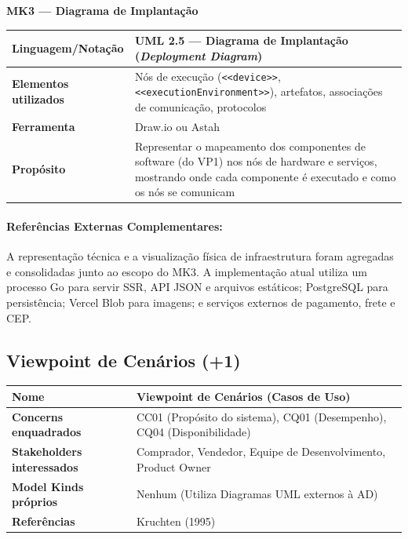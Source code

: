 ﻿\documentclass[12pt,a4paper]{article}
\begin{document}
\noindent\textbf{MK3 --- Diagrama de Implantação}
\begin{longtable}{|p{4.5cm}|p{10cm}|}
\hline
\textbf{Linguagem/Notação} & UML 2.5 --- Diagrama de Implantação (\textit{Deployment Diagram}) \\
\hline
\textbf{Elementos utilizados} & Nós de execução (\texttt{<<device>>}, \texttt{<<executionEnvironment>>}), artefatos, associações de comunicação, protocolos \\
\hline
\textbf{Ferramenta} & Draw.io ou Astah \\
\hline
\textbf{Propósito} & Representar o mapeamento dos componentes de software (do VP1) nos nós de hardware e serviços, mostrando onde cada componente é executado e como os nós se comunicam \\
\hline
\end{longtable}

\paragraph{Referências Externas Complementares:} A representação técnica e a visualização física de infraestrutura foram agregadas e consolidadas junto ao escopo do MK3. A implementação atual utiliza um processo Go para servir SSR, API JSON e arquivos estáticos; PostgreSQL para persistência; Vercel Blob para imagens; e serviços externos de pagamento, frete e CEP.

\subsection{Viewpoint de Cenários (+1)}

\begin{longtable}{|p{4.5cm}|p{10cm}|}
\hline
\textbf{Nome} & Viewpoint de Cenários (Casos de Uso) \\
\hline
\textbf{Concerns enquadrados} & CC01 (Propósito do sistema), CQ01 (Desempenho), CQ04 (Disponibilidade) \\
\hline
\textbf{Stakeholders interessados} & Comprador, Vendedor, Equipe de Desenvolvimento, Product Owner \\
\hline
\textbf{Model Kinds próprios} & Nenhum (Utiliza Diagramas UML externos à AD) \\
\hline
\textbf{Referências} & Kruchten (1995) \\
\hline
\end{longtable}
\end{document}
